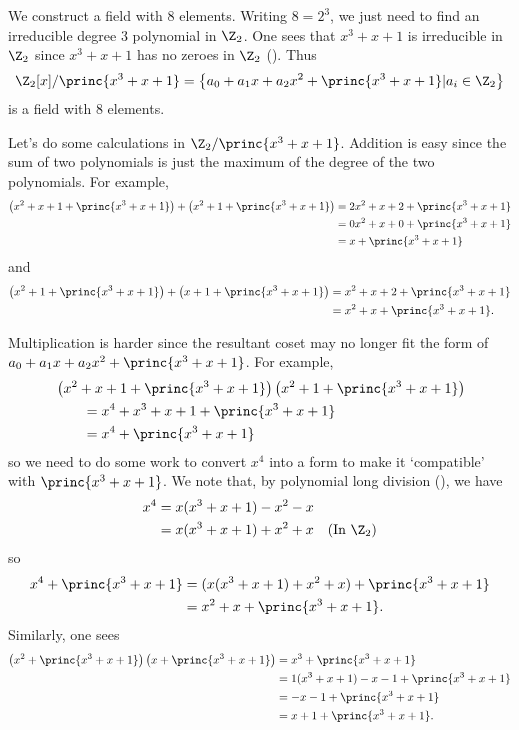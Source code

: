 \begin{example}
    We construct a field with 8 elements. Writing $8 = 2^3$, we just need to find an irreducible degree 3 polynomial in $\Z_2$. One sees that $x^3 + x + 1$ is irreducible in $\Z_2$ since $x^3 + x + 1$ has no zeroes in $\Z_2$ (). Thus
    \[
        \Z_2[x]/\princ{x^3+x+1} = \left\{a_0 + a_1x + a_2x^2 + \princ{x^3+x+1} \vert a_i \in \Z_2\right\}
    \]
    is a field with 8 elements.

    Let's do some calculations in $\Z_2/\princ{x^3+x+1}$. Addition is easy since the sum of two polynomials is just the maximum of the degree of the two polynomials. For example,
    \begin{align*}
        \left(x^2 + x + 1 + \princ{x^3 + x + 1}\right) + \left(x^2 + 1 + \princ{x^3 + x + 1}\right) &= 2x^2 + x + 2 + \princ{x^3 + x + 1}\\
        &= 0x^2 + x + 0 + \princ{x^3 + x + 1}\\
        &= x + \princ{x^3 + x + 1}
    \end{align*}
    and
    \begin{align*}
        \left(x^2 + 1 + \princ{x^3 + x + 1}\right) + \left(x + 1 + \princ{x^3 + x + 1}\right) &= x^2 + x + 2 + \princ{x^3 + x + 1}\\
        &= x^2 + x + \princ{x^3 + x + 1}.
    \end{align*}

    Multiplication is harder since the resultant coset may no longer fit the form of $a_0 + a_1x + a_2x^2 + \princ{x^3+x+1}$. For example,
    \begin{align*}
        &\left(x^2 + x + 1 + \princ{x^3 + x + 1}\right)\left(x^2 + 1 + \princ{x^3 + x + 1}\right)\\
        &\quad\quad= x^4+x^3+x+1 + \princ{x^3 + x + 1}\\
        &\quad\quad= x^4 + \princ{x^3 + x + 1}
    \end{align*}
    so we need to do some work to convert $x^4$ into a form to make it `compatible' with $\princ{x^3 + x + 1}$. We note that, by polynomial long division (), we have
    \begin{align*}
        x^4 &= x(x^3+x+1) - x^2 - x\\
        &= x(x^3+x+1) + x^2 + x & (\text{In } \Z_2)
    \end{align*}
    so
    \begin{align*}
        x^4 + \princ{x^3 + x + 1} &= (x(x^3+x+1) + x^2 + x) + \princ{x^3 + x + 1}\\
        &= x^2 + x + \princ{x^3 + x + 1}.
    \end{align*}
    Similarly, one sees
    \begin{align*}
        \left(x^2 + \princ{x^3 + x + 1}\right)\left(x + \princ{x^3 + x + 1}\right) &= x^3 + \princ{x^3 + x + 1}\\
        &= 1(x^3+x+1) - x - 1 + \princ{x^3 + x + 1}\\
        &= -x - 1 + \princ{x^3 + x + 1}\\
        &= x + 1 + \princ{x^3 + x + 1}.
    \end{align*}
\end{example}

